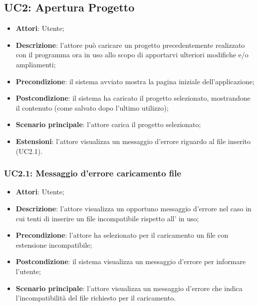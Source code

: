 \subsection{UC2: Apertura Progetto}
\label{UC2}
\begin{itemize}
	\item \textbf{Attori}: Utente;
	\item \textbf{Descrizione}: l'attore può caricare un progetto precedentemente realizzato con il programma ora in uso allo scopo di apportarvi ulteriori modifiche e/o ampliamenti;
	\item \textbf{Precondizione}: il sistema avviato mostra la pagina iniziale dell'applicazione;
	\item \textbf{Postcondizione}: il sistema ha caricato il progetto selezionato, mostrandone il contenuto (come salvato dopo l'ultimo utilizzo);
	\item \textbf{Scenario principale}: l'attore carica il progetto selezionato;
	\item \textbf{Estensioni}: l'attore visualizza un messaggio d'errore riguardo al file inserito (UC2.1).
\end{itemize}

\subsubsection{UC2.1: Messaggio d'errore caricamento file}
\label{UC2.1}
\begin{itemize}
	\item \textbf{Attori}: Utente;
	\item \textbf{Descrizione}: l'attore visualizza un opportuno messaggio d'errore nel caso in cui tenti di inserire un file incompatibile rispetto all' in uso;
	\item \textbf{Precondizione}: l'attore ha selezionato per il caricamento un file con estensione incompatibile;
	\item \textbf{Postcondizione}: il sistema visualizza un messaggio d'errore per informare l'utente;
	\item \textbf{Scenario principale}: l'attore visualizza un messaggio d'errore che indica l'incompatibilità del file richiesto per il caricamento.
\end{itemize}

